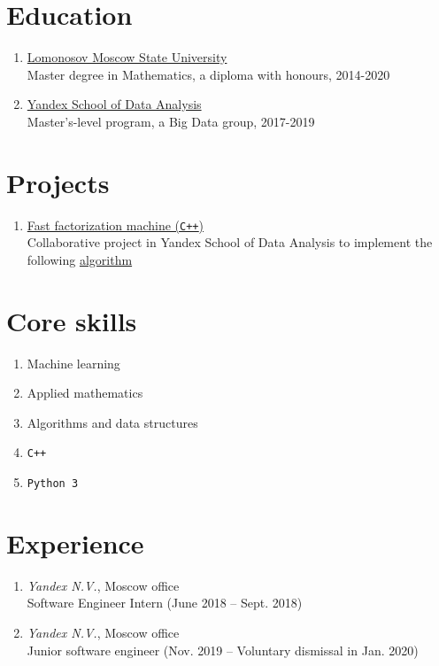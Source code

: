 \documentclass[twocolumn,9pt]{extarticle}
\begin{document}
\vfill

\section{Education}

\begin{enumerate}
  \item \href{https://www.msu.ru/en/}{Lomonosov Moscow State University} \\
    \quad Master degree in Mathematics, a diploma with honours, 2014-2020
  \item \href{https://yandexdataschool.com}{Yandex School of Data Analysis} \\
    \quad Master’s-level program, a Big Data group, 2017-2019
\end{enumerate}

\section{Projects}

\begin{enumerate}
\item \href{https://gitlab.com/Byobe/fast-fm-shad-2019}{Fast factorization machine (\texttt{C++})} \\
  \quad Collaborative project in Yandex School of Data Analysis to implement the following \href{https://www.csie.ntu.edu.tw/~b97053/paper/Rendle2010FM.pdf}{algorithm}
\end{enumerate}

\section{Core skills}

\begin{enumerate}
  \item Machine learning
  \item Applied mathematics
  \item Algorithms and data structures
  \item \texttt{C++}
  \item \texttt{Python 3}
\end{enumerate}

\section{Experience}

\begin{enumerate}
  \item \textit{Yandex N.V.}, Moscow office \\
    \quad Software Engineer Intern (June 2018 -- Sept. 2018)
  \item \textit{Yandex N.V.}, Moscow office \\
    \quad Junior software engineer (Nov. 2019 -- Voluntary dismissal in Jan. 2020)
\end{enumerate}
\end{document}
